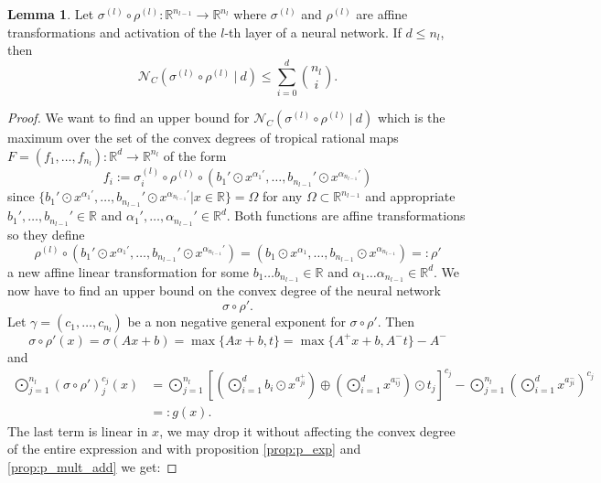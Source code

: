 \documentclass{article}
\theoremstyle{definition}
\newtheorem{lemma}[theorem]{Lemma}
\begin{document}
\begin{lemma}\hspace{1sp}\cite{maclagan2015introduction}\label{lem:bound}
Let $\sigma^{(l)} \circ \rho^{(l)}: \mathbb{R}^{n_{l-1}} \to \mathbb{R}^{n_l}$ where $\sigma^{(l)}$ and $\rho^{(l)}$ are affine transformations and activation of the $l$-th layer of a neural network. If $d \leq n_l$, then
$$\mathcal{N}_C(\sigma^{(l)} \circ \rho^{(l)} \ | \ d) \leq \displaystyle\sum_{i=0}^{d}\binom{n_l}{i}.$$
\end{lemma}
\begin{proof}
We want to find an upper bound for $\mathcal{N}_C(\sigma^{(l)} \circ \rho^{(l)} \ | \ d)$ which is the maximum over the set of the convex degrees of tropical rational maps $F = (f_1, \dots , f_{n_{l}}): \mathbb{R}^{d} \to \mathbb{R}^{n_l}$ of the form
$$f_i := \sigma_{i}^{(l)} \circ \rho^{(l)} \circ (b_1' \odot x^{\alpha_1'}, \dots , b_{n_{l-1}}' \odot x^{\alpha_{n_{l-1}}'})$$ since $\{b_1' \odot x^{\alpha_1'}, \dots , b_{n_{l-1}}' \odot x^{\alpha_{n_{l-1}}'} | x \in \mathbb{R}\} = \Omega$ for any $\Omega \subset \mathbb{R}^{n_{l-1}}$ and appropriate $b_1', \dots , b_{n_{l-1}}' \in \mathbb{R}$ and $\alpha_1', \dots , \alpha_{n_{l-1}}' \in \mathbb{R}^{d}$. Both functions are affine transformations so they define
$$\rho^{(l)} \circ (b_1' \odot x^{\alpha_1'}, \dots , b_{n_{l-1}}' \odot x^{\alpha_{n_{l-1}}'}) = (b_1 \odot x^{\alpha_1}, \dots , b_{n_{l-1}} \odot x^{\alpha_{n_{l-1}}}) =: \rho'$$
a new affine linear transformation for some $b_1 \dots b_{n_{l-1}} \in \mathbb{R}$ and $\alpha_1 \dots \alpha_{n_{l-1}} \in \mathbb{R}^{d}$.
We now have to find an upper bound on the convex degree of the neural network
$$\sigma \circ \rho'.$$
Let $\gamma = (c_1, \dots , c_{n_l})$ be a non negative general exponent for $\sigma \circ \rho'$. Then
$$\sigma \circ \rho'(x) = \sigma(Ax+b) = \max\{Ax+b, t\} = \max\{A^{+}x+b,A^{-}t\}-A^{-}$$
and
\begin{align*}
\displaystyle\bigodot_{j=1}^{n_l}(\sigma \circ \rho')_{j}^{c_j}(x) &= \displaystyle\bigodot_{j=1}^{n_l}\left[\left(\displaystyle\bigodot^{d}_{i=1}b_i \odot x^{a^{+}_{ji}}\right) \oplus \left( \displaystyle\bigodot_{i=1}^{d} x^{a_{ij}^{-}} \right) \odot t_j\right]^{c_j} - \displaystyle\bigodot^{n_l}_{j=1}\left(\displaystyle\bigodot_{i=1}^{d} x^{a_{ji}^{-}}\right)^{c_j} \\
&=: g(x).
\end{align*}
The last term is linear in $x$, we may drop it without affecting the convex degree of the entire expression and with proposition \ref{prop:p_exp} and \ref{prop:p_mult_add} we get:

\end{proof}
\end{document}
